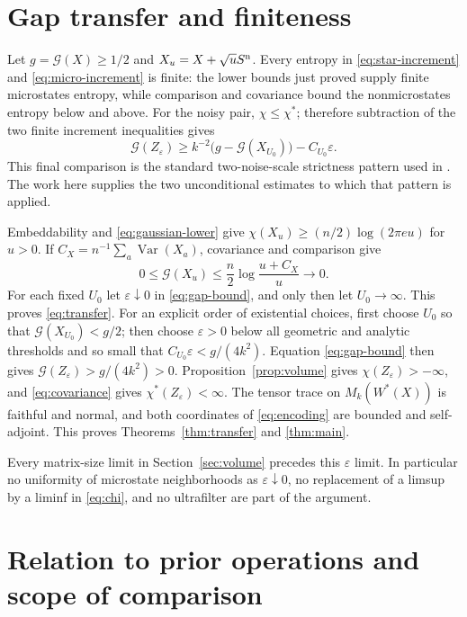 \documentclass[11pt]{article}
\theoremstyle{definition}\newtheorem{definition}[theorem]{Definition}
\theoremstyle{remark}\newtheorem{remark}[theorem]{Remark}
\newcommand{\eps}{\varepsilon}\newcommand{\id}{\mathrm{id}}
\newcommand{\gap}{\mathcal G}\newcommand{\Enc}{E_{\eps}}
\begin{document}
\section{Gap transfer and finiteness}
\label{sec:finish}
Let $g=\gap(X)\geq1/2$ and $X_u=X+\sqrt u S^{\rm n}$.
Every entropy in \eqref{eq:star-increment} and
\eqref{eq:micro-increment} is finite: the lower bounds just proved
supply finite microstates entropy, while comparison and covariance
bound the nonmicrostates entropy below and above.
For the noisy pair, $\chi\leq\chi^*$; therefore subtraction of the
two finite increment inequalities gives
\begin{equation}\label{eq:gap-bound}
 \gap(Z_\eps)\geq k^{-2}\big(g-\gap(X_{U_0})\big)-C_{U_0}\eps.
\end{equation}
This final comparison is the standard two-noise-scale strictness
pattern used in \cite{source298}. The work here supplies the two
unconditional estimates to which that pattern is applied.

Embeddability and \eqref{eq:gaussian-lower} give
$\chi(X_u)\geq(n/2)\log(2\pi e u)$ for $u>0$. If
$C_X=n^{-1}\sum_a\operatorname{Var}(X_a)$, covariance and comparison
give
\begin{equation}\label{eq:large-noise-gap}
 0\leq\gap(X_u)\leq\frac n2\log\frac{u+C_X}{u}\longrightarrow0.
\end{equation}
For each fixed $U_0$ let $\eps\downarrow0$ in
\eqref{eq:gap-bound}, and only then let $U_0\to\infty$.
This proves \eqref{eq:transfer}.
For an explicit order of existential choices, first choose $U_0$ so
that $\gap(X_{U_0})<g/2$; then choose $\eps>0$ below all geometric
and analytic thresholds and so small that
$C_{U_0}\eps<g/(4k^2)$. Equation \eqref{eq:gap-bound} then gives
$\gap(Z_\eps)>g/(4k^2)>0$.
Proposition~\ref{prop:volume} gives $\chi(Z_\eps)>-\infty$, and
\eqref{eq:covariance} gives $\chi^*(Z_\eps)<\infty$.
The tensor trace on $M_k(W^*(X))$ is faithful and normal, and both
coordinates of \eqref{eq:encoding} are bounded and self-adjoint.
This proves Theorems~\ref{thm:transfer} and \ref{thm:main}.

Every matrix-size limit in Section~\ref{sec:volume} precedes this
$\eps$ limit. In particular no uniformity of microstate neighborhoods
as $\eps\downarrow0$, no replacement of a limsup by a liminf in
\eqref{eq:chi}, and no ultrafilter are part of the argument.

\section{Relation to prior operations and scope of comparison}
\label{sec:comparison}
\end{document}
